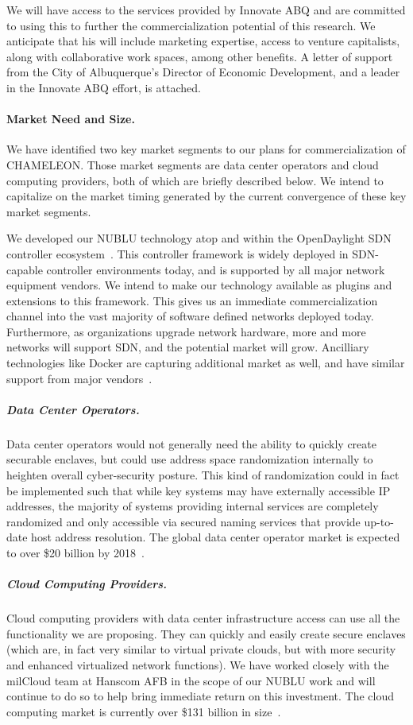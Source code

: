 \documentclass{sbir}
\begin{document}
We will have access to the services provided by Innovate ABQ and are committed to using this to further the commercialization potential of this research. We anticipate that his will include marketing expertise, access to venture capitalists, along with collaborative work spaces, among other benefits. A letter of support from the City of Albuquerque's Director of Economic Development, and a leader in the Innovate ABQ effort, is attached.

\paragraph{Market Need and Size.} We have identified two key market segments to our plans for commercialization of CHAMELEON. Those market segments are data center operators and cloud computing providers, both of which are briefly described below. We intend to capitalize on the market timing generated by the current convergence of these key market segments.

We developed our NUBLU technology atop and within the OpenDaylight SDN controller ecosystem~\cite{opendaylight}. This controller framework is widely deployed in SDN-capable controller environments today, and is supported by all major network equipment vendors. We intend to make our technology available as plugins and extensions to this framework. This gives us an immediate commercialization channel into the vast majority of software defined networks deployed today. Furthermore, as organizations upgrade network hardware, more and more networks will support SDN, and the potential market will grow. Ancilliary technologies like Docker are capturing additional market as well, and have similar support from major vendors~\cite{docker}.

\vspace{-12pt}
\subparagraph{Data Center Operators.} Data center operators would not generally need the ability to quickly create securable enclaves, but could use address space randomization internally to heighten overall cyber-security posture. This kind of randomization could in fact be implemented such that while key systems may have externally accessible IP addresses, the majority of systems providing internal services are completely randomized and only accessible via secured naming services that provide up-to-date host address resolution. The global data center operator market is expected to over \$20 billion by 2018~\cite{datacentermarket}.

\vspace{-12pt}
\subparagraph{Cloud Computing Providers.} Cloud computing providers with data center infrastructure access can use all the functionality we are proposing. They can quickly and easily create secure enclaves (which are, in fact very similar to virtual private clouds, but with more security and enhanced virtualized network functions). We have worked closely with the milCloud team at Hanscom AFB in the scope of our NUBLU work and will continue to do so to help bring immediate return on this investment. The cloud computing market is currently over \$131 billion in size~\cite{cloudmarket}.
\end{document}

